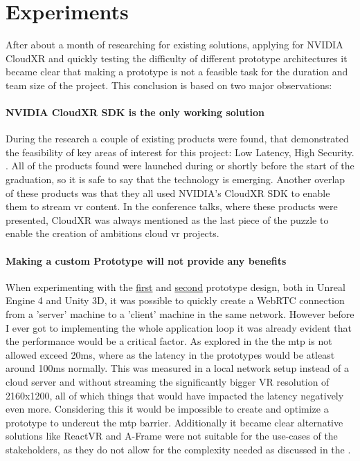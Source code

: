 \section{Experiments}

After about a month of researching for existing solutions, applying for NVIDIA CloudXR and quickly testing the difficulty of different prototype architectures it became clear that making a prototype is not a feasible task for the duration and team size of the project. This conclusion is based on two major observations:

\paragraph{NVIDIA CloudXR SDK is the only working solution}
During the research a couple of existing products were found, that demonstrated the feasibility of key areas of interest for this project: Low Latency, High Security. \parencite{gtc2020esi}. All of the products found were launched during or shortly before the start of the graduation, so it is safe to say that the technology is emerging. Another overlap of these products was that they all used NVIDIA's CloudXR SDK to enable them to stream \acrshort{vr} content. In the conference talks, where these products were presented, CloudXR was always mentioned as the last piece of the puzzle to enable the creation of ambitions cloud \acrshort{vr} projects.

\paragraph{Making a custom Prototype will not provide any benefits}
When experimenting with the \hyperref[fig:pr11]{first} and \hyperref[fig:pr12]{second} prototype design, both in Unreal Engine 4 and Unity 3D, it was possible to quickly create a WebRTC connection from a 'server' machine to a 'client' machine in the same network. However before I ever got to implementing the whole application loop it was already evident that the performance would be a critical factor. As explored in the  the \acrfull{mtp} is not allowed exceed 20\acrshort{ms}, where as the latency in the prototypes would be atleast around 100\acrshort{ms} normally. This was measured in a local network setup instead of a cloud server and without streaming the significantly bigger VR resolution of 2160x1200, all of which things that would have impacted the latency negatively even more. Considering this it would be impossible to create and optimize a prototype to undercut the \acrshort{mtp} barrier. Additionally it became clear alternative solutions like ReactVR \parencite{reactVR} and A-Frame \parencite{aframe} were not suitable for the use-cases of the stakeholders, as they do not allow for the complexity needed as discussed in the . 

